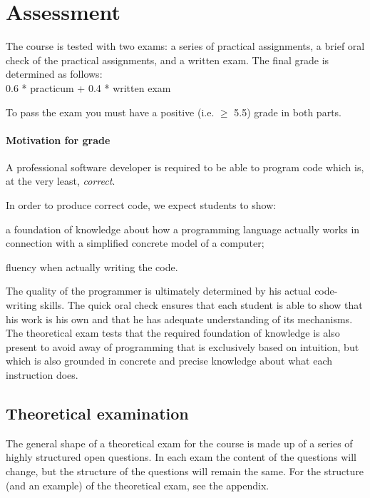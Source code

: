 \section{Assessment}
	The course is tested with two exams: a series of practical assignments, a brief oral check of the practical assignments, and a written exam. The final grade is determined as follows: \\

	0.6 * practicum + 0.4 * written exam

	To pass the exam you must have a positive (i.e. $\geq$ 5.5) grade in both parts.

	\paragraph*{Motivation for grade}
		A professional software developer is required to be able to program code which is, at the very least, \textit{correct}.

		In order to produce correct code, we expect students to show:
		\begin{inparaenum}
			\item a foundation of knowledge about how a programming language actually works in connection with a simplified concrete model of a computer;
			\item fluency when actually writing the code.
		\end{inparaenum}

		The quality of the programmer is ultimately determined by his actual code-writing skills. The quick oral check ensures that each student is able to show that his work is his own and that he has adequate understanding of its mechanisms. The theoretical exam tests that the required foundation of knowledge is also present to avoid away of programming that is exclusively based on intuition, but which is also grounded in concrete and precise knowledge about what each instruction does.


	\subsection{Theoretical examination}
		The general shape of a theoretical exam for the course is made up of a series of highly structured open questions. In each exam the content of the questions will change, but the structure of the questions will remain the same. For the structure (and an example) of the theoretical exam, see the appendix.


